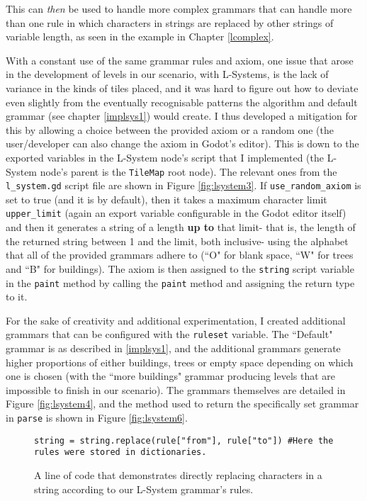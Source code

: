 This can \textit{then} be used to handle more complex grammars that can handle more than one rule in which characters in strings are replaced by other strings of variable length, as seen in the example in Chapter \ref{lcomplex}.

With a constant use of the same grammar rules and axiom, one issue that arose in the development of levels in our scenario, with L-Systems, is the lack of variance in the kinds of tiles placed, and it was hard to figure out how to deviate even slightly from the eventually recognisable patterns the algorithm and default grammar (see chapter \ref{implsys1}) would create. I thus developed a mitigation for this by allowing a choice between the provided axiom or a random one (the user/developer can also change the axiom in Godot's editor). This is down to the exported variables in the L-System node's script that I implemented (the L-System node's parent is the \verb|TileMap| root node). The relevant ones from the \verb|l_system.gd| script file are shown in Figure \ref{fig:lsystem3}. If \verb|use_random_axiom| is set to true (and it is by default), then it takes a maximum character limit \verb|upper_limit| (again an export variable configurable in the Godot editor itself) and then it generates a string of a length \textbf{up to} that limit- that is, the length of the returned string between 1 and the limit, both inclusive- using the alphabet that all of the provided grammars adhere to (``O" for blank space, ``W" for trees and ``B" for buildings). The axiom is then assigned to the \verb|string| script variable in the \verb|paint| method by calling the \verb|paint| method and assigning the return type to it.

For the sake of creativity and additional experimentation, I created additional grammars that can be configured with the \verb|ruleset| variable. The ``Default" grammar is as described in \ref{implsys1}, and the additional grammars generate higher proportions of either buildings, trees or empty space depending on which one is chosen (with the ``more buildings" grammar producing levels that are impossible to finish in our scenario). The grammars themselves are detailed in Figure \ref{fig:lsystem4}, and the method used to return the specifically set grammar in \verb|parse| is shown in Figure \ref{fig:lsystem6}.

\begin{figure}[H]
    \centering
    \begin{lstlisting}
string = string.replace(rule["from"], rule["to"]) #Here the rules were stored in dictionaries.
    \end{lstlisting}
    \caption{A line of code that demonstrates directly replacing characters in a string according to our L-System grammar's rules.}
    \label{fig:lsystem1}
\end{figure}

